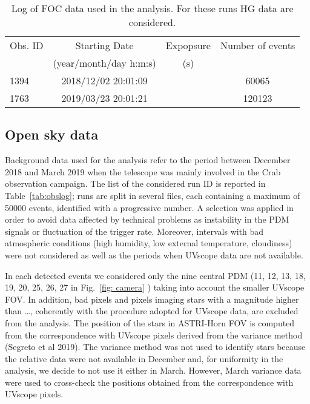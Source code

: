 \begin{table*}[htbp!!]
\centering
\caption{Log of FOC data used in the analysis. For these runs HG data are considered. }
\label{tab:FOC}
\begin{tabular}{lccc}
\hline\hline
Obs. ID & Starting Date &  Expopsure & Number of events \\
               & (year/month/day h:m:s) & (s)   \\
\hline     
1394 & 2018/12/02 20:01:09  &  & 60065     \\
1763 & 2019/03/23 20:01:21  &  & 120123    \\ 
\hline\hline
\end{tabular}
\end{table*}

\subsection{Open sky data} 
\label{subs:skydata}

Background data used for the analysis refer to the period between December 2018 and March 2019 when the telescope was mainly involved in the Crab observation campaign. The list of the considered run ID is reported in Table~\ref{tab:obslog}; runs are split in several files, each containing a maximum of 50000 events, identified with a progressive number.
A selection was applied in order to avoid data affected by technical problems as instability in the PDM signals or fluctuation of the trigger rate. Moreover, intervals with bad atmospheric conditions 
(high humidity, low external temperature, cloudiness) were not considered as well as the periods when UVscope data are not available.

In each detected events we considered only the nine central PDM (11, 12, 13, 18, 19, 20, 25, 26, 27 in Fig.~\ref{fig: camera} ) taking into account the smaller UVscope FOV.  In addition, bad pixels and pixels imaging stars with a magnitude higher than …, coherently with the procedure adopted for UVscope data, are excluded from the analysis. The position of the stars in ASTRI-Horn FOV is computed from the correspondence with UVscope pixels derived from the variance method (Segreto et al 2019). 
The variance method was not used to identify stars because the relative data were not available in December and, for uniformity in the analysis, we decide to not use it either in March.  However, March variance data were used to cross-check the positions obtained from the correspondence with UVscope pixels.


